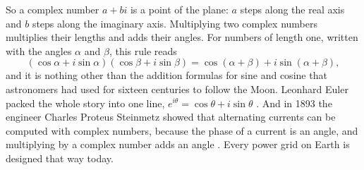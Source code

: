 So a complex number $a + bi$ is a point of the plane: $a$ steps along the real axis and $b$ steps along the imaginary axis. Multiplying two complex numbers multiplies their lengths and adds their angles. For numbers of length one, written with the angles $\alpha$ and $\beta$, this rule reads
\[
(\cos\alpha + i \sin\alpha)(\cos\beta + i\sin\beta) = \cos(\alpha + \beta) + i\sin(\alpha + \beta),
\]
and it is nothing other than the addition formulas for sine and cosine that astronomers had used for sixteen centuries to follow the Moon. Leonhard Euler packed the whole story into one line, $e^{i\theta} = \cos\theta + i\sin\theta$ \citep{Euler1748}. And in 1893 the engineer Charles Proteus Steinmetz showed that alternating currents can be computed with complex numbers, because the phase of a current is an angle, and multiplying by a complex number adds an angle \citep{Steinmetz1893}. Every power grid on Earth is designed that way today.

